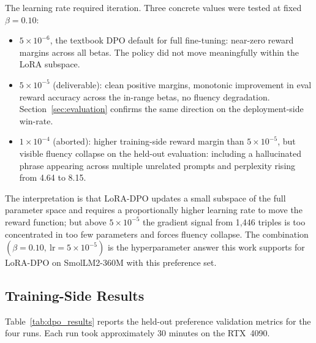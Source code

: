 \documentclass[../main.tex]{subfiles}
\begin{document}
The learning rate required iteration. Three concrete values were tested at fixed $\beta = 0.10$:

\begin{itemize}
  \item $5 \times 10^{-6}$, the textbook DPO default for full fine-tuning: near-zero reward margins across all betas. The policy did not move meaningfully within the LoRA subspace.
  \item $5 \times 10^{-5}$ (deliverable): clean positive margins, monotonic improvement in eval reward accuracy across the in-range betas, no fluency degradation. Section~\ref{sec:evaluation} confirms the same direction on the deployment-side win-rate.
  \item $1 \times 10^{-4}$ (aborted): higher training-side reward margin than $5 \times 10^{-5}$, but visible fluency collapse on the held-out evaluation: including a hallucinated phrase appearing across multiple unrelated prompts and perplexity rising from 4.64 to 8.15.
\end{itemize}

The interpretation is that LoRA-DPO updates a small subspace of the full parameter space and requires a proportionally higher learning rate to move the reward function; but above $5 \times 10^{-5}$ the gradient signal from 1{,}446 triples is too concentrated in too few parameters and forces fluency collapse. The combination $(\beta = 0.10,\ \text{lr} = 5 \times 10^{-5})$ is the hyperparameter answer this work supports for LoRA-DPO on SmolLM2-360M with this preference set.

\subsection{Training-Side Results}
\label{sec:dpo_results}

Table~\ref{tab:dpo_results} reports the held-out preference validation metrics for the four runs. Each run took approximately 30 minutes on the RTX~4090.
\end{document}
